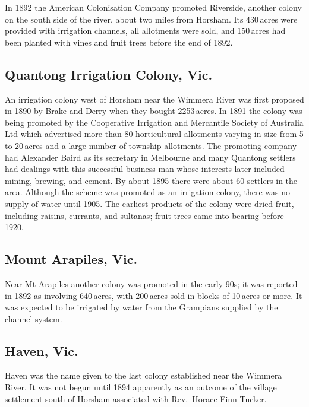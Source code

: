 In 1892 the American Colonisation Company promoted Riverside, another
colony on the south side of the river, about two miles from Horsham.
Its 430\,acres were provided with irrigation channels, all allotments
were sold, and 150\,acres had been planted with vines and fruit trees
before the end of 1892.

\subsection*{Quantong Irrigation Colony, Vic.}

An irrigation colony west of Horsham near the Wimmera River was first
proposed in 1890 by Brake and Derry when they bought 2253\,acres.  In
1891 the colony was being promoted by the Cooperative Irrigation and
Mercantile Society of Australia Ltd  which advertised more than 80
horticultural allotments varying in size from 5 to 20\,acres and a
large number of township allotments.  The promoting company had
Alexander Baird  as its secretary in Melbourne and
many Quantong settlers had dealings with this successful business man
whose interests later included mining, brewing, and cement.  By about
1895 there were about 60 settlers in the area.  Although the scheme
was promoted as an irrigation colony, there was no supply of water
until 1905.  The earliest products of the colony were dried fruit,
including raisins, currants, and sultanas; fruit trees came into
bearing before 1920.

\subsection*{Mount Arapiles, Vic.}

Near Mt Arapiles another colony was promoted in the early 90s; it was
reported in 1892 as involving 640\,acres, with 200\,acres sold in
blocks of 10\,acres or more.  It was expected to be irrigated by water
from the Grampians supplied by the channel
system.

\subsection*{Haven, Vic.}

Haven was the name given to the last colony established near the
Wimmera River.  It was not begun until 1894 apparently as an outcome
of the village settlement south of Horsham associated with Rev.~Horace
Finn Tucker.

